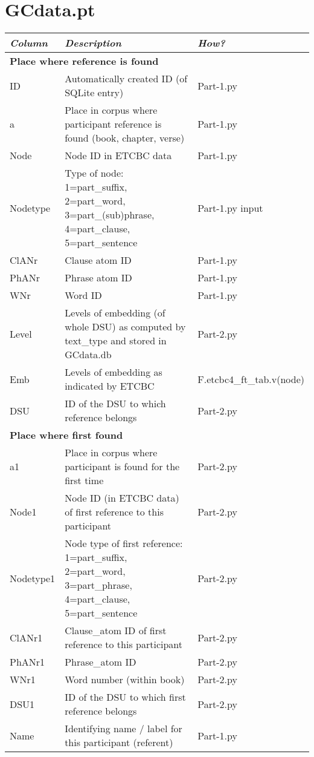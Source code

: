 \documentclass{article}
\newcommand{\fixme}[1]{\color{red} #1}
\begin{document}
\section{GCdata.pt}

\begin{longtable}{|l|p{}|l|}
\hline
\emph{Column} & \emph{Description} & \emph{How?}\\ \hline
\multicolumn{3}{|l|}{\bf{Place where reference is found}} \\ \hline
ID & Automatically created ID (of SQLite entry) & Part-1.py \\ \hline
a & Place in corpus where participant reference is found (book, chapter, verse) & Part-1.py \\ \hline
Node & Node ID in ETCBC data & Part-1.py \\ \hline
Nodetype & Type of node: 1=part\_suffix, 2=part\_word, 3=part\_(sub)phrase, 4=part\_clause, 5=part\_sentence & Part-1.py input\\ \hline
ClANr & Clause atom ID & Part-1.py \\ \hline
PhANr & Phrase atom ID & Part-1.py \\ \hline
WNr & Word ID & Part-1.py \\ \hline
Level & Levels of embedding (of whole DSU) as computed by text\_type and stored in GCdata.db & Part-2.py\\ \hline
Emb & Levels of embedding as indicated by ETCBC & \fixme{F.etcbc4\_ft\_tab.v(node)} \\ \hline
DSU & ID of the DSU to which reference belongs & Part-2.py \\ \hline

\multicolumn{3}{|l|}{\bf{Place where first found}} \\ \hline

a1 & Place in corpus where participant is found for the first time & Part-2.py \\ \hline
Node1 & Node ID (in ETCBC data) of first reference to this participant & Part-2.py \\ \hline
Nodetype1 & Node type of first reference: 1=part\_suffix, 2=part\_word, 3=part\_phrase, 4=part\_clause, 5=part\_sentence & Part-2.py\\ \hline
ClANr1 & Clause\_atom ID of first reference to this participant & Part-2.py\\ \hline
PhANr1 & Phrase\_atom ID & Part-2.py\\ \hline
WNr1 & Word number (within book) & Part-2.py\\ \hline
DSU1 & ID of the DSU to which first reference belongs & Part-2.py\\ \hline
Name & Identifying name / label for this participant (referent) & Part-1.py \\ \hline


\end{longtable}
\end{document}
